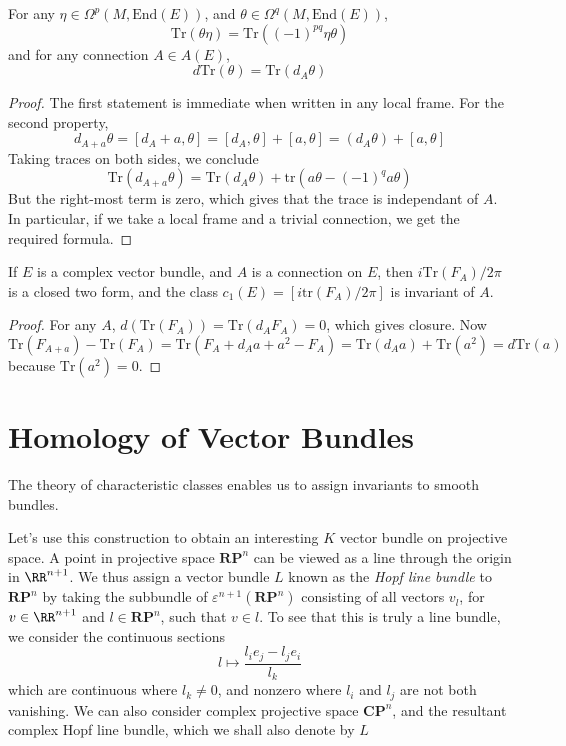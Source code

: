 \begin{lemma}
    For any $\eta \in \Omega^p(M,\text{End}(E))$, and $\theta \in \Omega^q(M,\text{End}(E))$,
    \[ \text{Tr}(\theta \eta) = \text{Tr}((-1)^{pq} \eta \theta) \]
    and for any connection $A \in A(E)$,
    \[ d \text{Tr}(\theta) = \text{Tr}(d_A \theta) \]
\end{lemma}
\begin{proof}
    The first statement is immediate when written in any local frame. For the second property,
    \[ d_{A + a} \theta = [d_A + a, \theta] = [d_A, \theta] + [a, \theta] = (d_A \theta) + [a,\theta] \]
    Taking traces on both sides, we conclude
    \[ \text{Tr}(d_{A + a} \theta) = \text{Tr}(d_A \theta) + \text{tr}(a \theta - (-1)^q a \theta) \]
    But the right-most term is zero, which gives that the trace is independant of $A$. In particular, if we take a local frame and a trivial connection, we get the required formula.
\end{proof}

\begin{theorem}
    If $E$ is a complex vector bundle, and $A$ is a connection on $E$, then $i \text{Tr}(F_A)/2\pi$ is a closed two form, and the class $c_1(E) = [i \text{tr}(F_A)/2 \pi]$ is invariant of $A$.
\end{theorem}
\begin{proof}
    For any $A$, $d(\text{Tr}(F_A)) = \text{Tr}(d_A F_A) = 0$, which gives closure. Now
    \[ \text{Tr}(F_{A + a}) - \text{Tr}(F_A) = \text{Tr}(F_A + d_A a + a^2 - F_A) = \text{Tr}(d_A a) + \text{Tr}(a^2) = d \text{Tr}(a) \]
    because $\text{Tr}(a^2) = 0$.
\end{proof}















\chapter{Homology of Vector Bundles}

The theory of characteristic classes enables us to assign invariants to smooth bundles.

Let's use this construction to obtain an interesting $K$ vector bundle on projective space. A point in projective space $\mathbf{RP}^n$ can be viewed as a line through the origin in $\RR^{n+1}$. We thus assign a vector bundle $L$ known as the \emph{Hopf line bundle} to $\mathbf{RP}^n$ by taking the subbundle of $\varepsilon^{n+1}(\mathbf{RP}^n)$ consisting of all vectors $v_l$, for $v \in \RR^{n+1}$ and $l \in \mathbf{RP}^n$, such that $v \in l$. To see that this is truly a line bundle, we consider the continuous sections
%
\[ l \mapsto \frac{l_i e_j - l_j e_i}{l_k} \]
%
which are continuous where $l_k \neq 0$, and nonzero where $l_i$ and $l_j$ are not both vanishing. We can also consider complex projective space $\mathbf{CP}^n$, and the resultant complex Hopf line bundle, which we shall also denote by $L$

